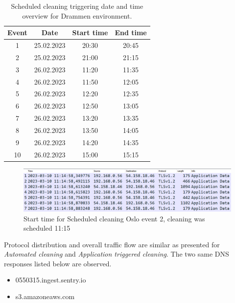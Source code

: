 \begin{table}[H]
\centering
\caption{Scheduled cleaning triggering date and time overview for Drammen environment.}
\label{tab:SC_dateandtimeDrammen}
\begin{tabular}{|c|c|c|c|}
\hline
\textbf{Event} & \textbf{Date} & \textbf{Start time} & \textbf{End time} \\ \hline
1              & 25.02.2023         & 20:30               & 20:45             \\ \hline
2              & 25.02.2023         & 21:00               & 21:15             \\ \hline
3              & 26.02.2023         & 11:20               & 11:35             \\ \hline
4              & 26.02.2023         & 11:50               & 12:05             \\ \hline
5              & 26.02.2023         & 12:20               & 12:35             \\ \hline
6              & 26.02.2023         & 12:50               & 13:05             \\ \hline
7              & 26.02.2023         & 13:20               & 13:35             \\ \hline
8              & 26.02.2023         & 13:50               & 14:05             \\ \hline
9              & 26.02.2023         & 14:20               & 14:35             \\ \hline
10             & 26.02.2023         & 15:00               & 15:15             \\ \hline
\end{tabular}
\end{table}

\begin{figure}[H]
    \centering
    \includegraphics[width=\textwidth]{figures/SC_start_time.png}
    \caption{Start time for Scheduled cleaning Oslo event 2, cleaning was scheduled 11:15}
    \label{fig:SC_start_time}
\end{figure}


Protocol distribution and overall traffic flow are similar as presented for \textit{Automated cleaning} and \textit{Application triggered cleaning}. The two same DNS responses listed below are observed. 
\begin{itemize}
    \item 0550315.ingest.sentry.io
    \item s3.amazoneaws.com
\end{itemize}


